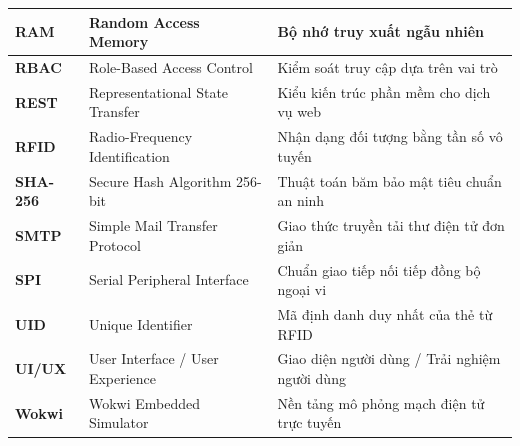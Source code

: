 \begin{table}[H]
\begin{tabular}{|p{2.8cm}|p{5.5cm}|p{6.0cm}|}
\hline
\textbf{RAM} & Random Access Memory & Bộ nhớ truy xuất ngẫu nhiên \\
\hline
\textbf{RBAC} & Role-Based Access Control & Kiểm soát truy cập dựa trên vai trò \\
\hline
\textbf{REST} & Representational State Transfer & Kiểu kiến trúc phần mềm cho dịch vụ web \\
\hline
\textbf{RFID} & Radio-Frequency Identification & Nhận dạng đối tượng bằng tần số vô tuyến \\
\hline
\textbf{SHA-256} & Secure Hash Algorithm 256-bit & Thuật toán băm bảo mật tiêu chuẩn an ninh \\
\hline
\textbf{SMTP} & Simple Mail Transfer Protocol & Giao thức truyền tải thư điện tử đơn giản \\
\hline
\textbf{SPI} & Serial Peripheral Interface & Chuẩn giao tiếp nối tiếp đồng bộ ngoại vi \\
\hline
\textbf{UID} & Unique Identifier & Mã định danh duy nhất của thẻ từ RFID \\
\hline
\textbf{UI/UX} & User Interface / User Experience & Giao diện người dùng / Trải nghiệm người dùng \\
\hline
\textbf{Wokwi} & Wokwi Embedded Simulator & Nền tảng mô phỏng mạch điện tử trực tuyến \\
\hline
\end{tabular}
\end{table}
\newpage
